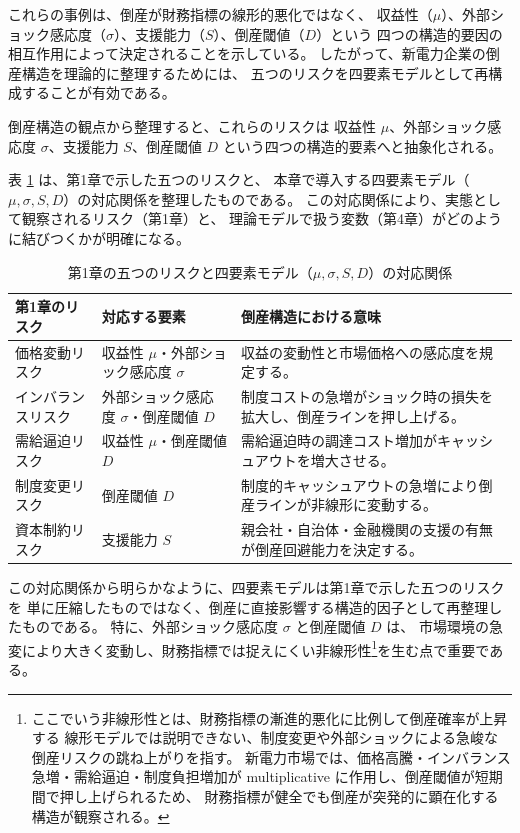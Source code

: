 これらの事例は、倒産が財務指標の線形的悪化ではなく、
収益性（$\mu$）、外部ショック感応度（$\sigma$）、支援能力（$S$）、倒産閾値（$D$）という
四つの構造的要因の相互作用によって決定されることを示している。
したがって、新電力企業の倒産構造を理論的に整理するためには、
五つのリスクを四要素モデルとして再構成することが有効である。

倒産構造の観点から整理すると、これらのリスクは
収益性 $\mu$、外部ショック感応度 $\sigma$、支援能力 $S$、倒産閾値 $D$
という四つの構造的要素へと抽象化される。

表 \ref{tab:risk_mapping} は、第1章で示した五つのリスクと、
本章で導入する四要素モデル（$\mu, \sigma, S, D$）の対応関係を整理したものである。
この対応関係により、実態として観察されるリスク（第1章）と、
理論モデルで扱う変数（第4章）がどのように結びつくかが明確になる。

\begin{table}[H]
\centering
\caption{第1章の五つのリスクと四要素モデル（$\mu, \sigma, S, D$）の対応関係}
\label{tab:risk_mapping}
\begin{tabular}{p{4cm} p{4cm} p{6cm}}
\toprule
\textbf{第1章のリスク} & \textbf{対応する要素} & \textbf{倒産構造における意味} \\
\midrule
価格変動リスク & 収益性 $\mu$・外部ショック感応度 $\sigma$ &
収益の変動性と市場価格への感応度を規定する。 \\

インバランスリスク & 外部ショック感応度 $\sigma$・倒産閾値 $D$ &
制度コストの急増がショック時の損失を拡大し、倒産ラインを押し上げる。 \\

需給逼迫リスク & 収益性 $\mu$・倒産閾値 $D$ &
需給逼迫時の調達コスト増加がキャッシュアウトを増大させる。 \\

制度変更リスク & 倒産閾値 $D$ &
制度的キャッシュアウトの急増により倒産ラインが非線形に変動する。 \\

資本制約リスク & 支援能力 $S$ &
親会社・自治体・金融機関の支援の有無が倒産回避能力を決定する。 \\
\bottomrule
\end{tabular}
\end{table}

この対応関係から明らかなように、四要素モデルは第1章で示した五つのリスクを
単に圧縮したものではなく、倒産に直接影響する構造的因子として再整理したものである。
特に、外部ショック感応度 $\sigma$ と倒産閾値 $D$ は、
市場環境の急変により大きく変動し、財務指標では捉えにくい非線形性\footnote{
ここでいう非線形性とは、財務指標の漸進的悪化に比例して倒産確率が上昇する
線形モデルでは説明できない、制度変更や外部ショックによる急峻な倒産リスクの跳ね上がりを指す。
新電力市場では、価格高騰・インバランス急増・需給逼迫・制度負担増加が
multiplicative に作用し、倒産閾値が短期間で押し上げられるため、
財務指標が健全でも倒産が突発的に顕在化する構造が観察される。}を生む点で重要である。


